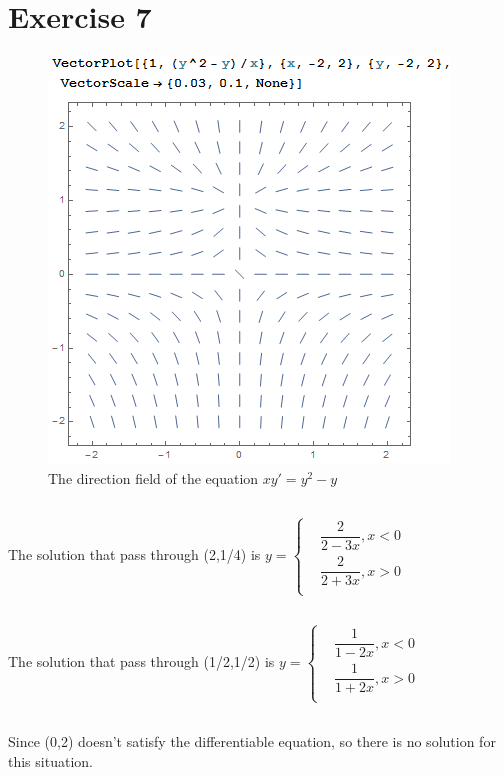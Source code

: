 \documentclass[a4paper,12pt,titlepage]{article}
\begin{document}
\section{Exercise 7}
\begin{figure}[ht]
	\centering
	\includegraphics[scale=1]{3.png}
	\caption{The direction field of the equation $xy'=y^2-y$}  
\end{figure}

\subsection{}
The solution that pass through (2,1/4) is $y=\left\{\begin{aligned}
&\dfrac{2}{2-3x},x<0\\
&\dfrac{2}{2+3x},x>0\\
\end{aligned}
\right.$

\subsection{}
The solution that pass through (1/2,1/2) is $y=\left\{\begin{aligned}
&\dfrac{1}{1-2x},x<0\\
&\dfrac{1}{1+2x},x>0\\
\end{aligned}
\right.$

\subsection{}
Since (0,2) doesn't satisfy the differentiable equation, so there is no solution for this situation.
\end{document}

